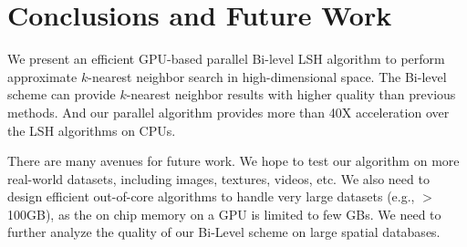 \begin{figure}[t]
\end{figure}




\section{Conclusions and Future Work}
We present an efficient GPU-based parallel Bi-level LSH algorithm to perform approximate $k$-nearest neighbor search in high-dimensional space. The Bi-level scheme can provide $k$-nearest neighbor results with higher quality than previous methods. And our parallel algorithm
provides more than 40X acceleration over the LSH algorithms on CPUs.

There are many avenues for future work.  We hope to test our algorithm on more real-world datasets, including images, textures, videos, etc. We also need to design efficient out-of-core algorithms to handle very large datasets (e.g., $>$ 100GB), as the on chip memory on a GPU is limited to few GBs. We need to further analyze the quality of our Bi-Level scheme on large spatial databases.








